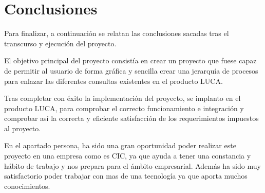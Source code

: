 	\chapter{Conclusiones}
	
	Para finalizar, a continuación se relatan las conclusiones sacadas tras el transcurso y ejecución del proyecto.
	
	\vspace{5mm}
	
	El objetivo principal del proyecto consistía en crear un proyecto que fuese capaz de permitir al usuario de forma gráfica y sencilla crear una jerarquía de procesos para enlazar las diferentes consultas existentes en el producto LUCA. 
	
	\vspace{5mm}
	
	Tras completar con éxito la implementación del proyecto, se implanto en el producto LUCA, para comprobar el correcto funcionamiento e integración y comprobar así la correcta y eficiente satisfacción de los requerimientos impuestos al proyecto.
	
	\vspace{5mm}
	
	En el apartado persona, ha sido una gran oportunidad poder realizar este proyecto en una empresa como es CIC, ya que ayuda a tener una constancia y hábito de trabajo y nos prepara para el ámbito empresarial. Además ha sido muy satisfactorio poder trabajar con mas de una tecnología ya que aporta muchos conocimientos.


	